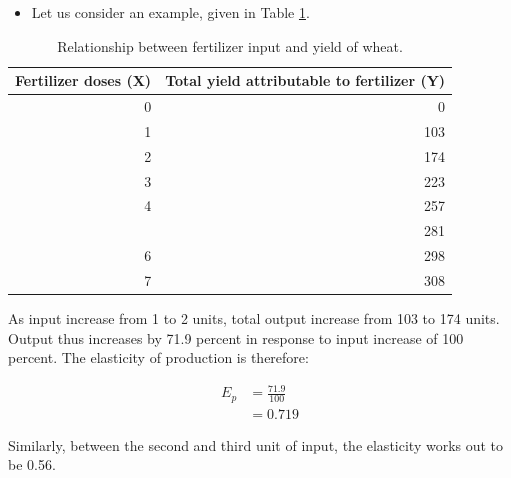 \documentclass[12pt,ignorenonframetext,aspectratio=169]{beamer}
\providecommand{\tightlist}{%
  \setlength{\itemsep}{0pt}\setlength{\parskip}{0pt}}
\begin{document}
\begin{frame}{}
\protect\hypertarget{section-11}{}
\begin{itemize}
\tightlist
\item
  Let us consider an example, given in Table
  \ref{tab:elasticity-production}.
\end{itemize}

\begin{table}

\caption{\label{tab:elasticity-production}Relationship between fertilizer input and yield of wheat.}
\centering
\fontsize{8}{10}\selectfont
\begin{tabular}[t]{rr}
\toprule
Fertilizer doses (X) & Total yield attributable to fertilizer (Y)\\
\midrule
\rowcolor{gray!6}  0 & 0\\
1 & 103\\
\rowcolor{gray!6}  2 & 174\\
3 & 223\\
\rowcolor{gray!6}  4 & 257\\
\addlinespace
5 & 281\\
\rowcolor{gray!6}  6 & 298\\
7 & 308\\
\bottomrule
\end{tabular}
\end{table}
\end{frame}

\begin{frame}{}
\protect\hypertarget{section-12}{}
As input increase from 1 to 2 units, total output increase from 103 to
174 units. Output thus increases by 71.9 percent in response to input
increase of 100 percent. The elasticity of production is therefore:

\[
\begin{aligned}
E_p &= {\frac{71.9}{100}} \\
&= 0.719
\end{aligned}
\]

Similarly, between the second and third unit of input, the elasticity
works out to be 0.56.
\end{frame}
\end{document}
